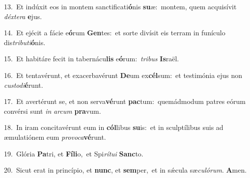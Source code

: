 {\numbfont\textcolor{\numbcolor}{13.}}~Et indúxit eos in montem sanctificati\-\textbf{ó}\-nis \textbf{su}\-æ:~\star montem, quem acquisívit \textit{déx}\-\textit{te}\textit{ra} \textbf{e}\-jus.\par
{\numbfont\textcolor{\numbcolor}{14.}}~Et ejécit a fácie e\-\textbf{ó}\-rum \textbf{Gen}\-tes:~\star et sorte divísit eis terram in funículo dis\-\textit{tri}\-\textit{bu}\textit{ti}\textbf{ó}nis.\par
{\numbfont\textcolor{\numbcolor}{15.}}~Et habitáre fecit in tabernácu\textbf{lis} e\-\textbf{ó}\-rum:~\star \textit{tri}\-\textit{bus} \textbf{Is}\-raël.\par
{\numbfont\textcolor{\numbcolor}{16.}}~Et tentavérunt, et exacerbavérunt \textbf{De}\-um ex\-\textbf{cél}\-sum:~\star et testimónia ejus non \textit{cus}\-\textit{to}\textit{di}\textbf{é}runt.\par
{\numbfont\textcolor{\numbcolor}{17.}}~Et avertérunt se, et non serva\-\textbf{vé}\-runt \textbf{pac}\-tum:~\star quemádmodum patres eórum convérsi sunt \textit{in} \textit{ar}\-\textit{cum} \textbf{pra}\-vum.\par
{\numbfont\textcolor{\numbcolor}{18.}}~In iram concitavérunt eum in \textbf{cól}\-libus \textbf{su}\-is:~\star et in sculptílibus suis ad æmulatiónem eum \textit{pro}\-\textit{vo}\textit{ca}\textbf{vé}runt.\par
{\numbfont\textcolor{\numbcolor}{19.}}~Glória \textbf{Pa}\-tri, et \textbf{Fí}\-\textbf{li}o,~\star et Spi\-\textit{rí}\-\textit{tu}\textit{i} \textbf{Sanc}\-to.\par
{\numbfont\textcolor{\numbcolor}{20.}}~Sicut erat in princípio, et \textbf{nunc}\-, et \textbf{sem}\-per,~\star et in sǽcula sæ\-\textit{cu}\-\textit{ló}\textit{rum}. \textbf{A}\-men.\par
